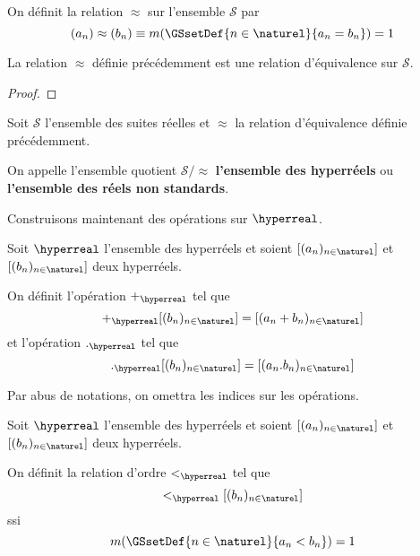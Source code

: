 \begin{definition}
	On définit la relation $\approx$ sur l'ensemble $\mathcal{S}$ par
	\begin{equation}
		(a_{n}) \approx (b_{n}) \equiv m(\GSsetDef{n \in \naturel}{a_{n} =
		b_{n}}) = 1
	\end{equation}
\end{definition}

\begin{proposition}
	La relation $\approx$ définie précédemment est une relation d'équivalence sur
	$\mathcal{S}$.
\end{proposition}

\ifdefined\outputproof
\begin{proof}

\end{proof}
\fi

\begin{definition}
	Soit $\mathcal{S}$ l'ensemble des suites réelles et $\approx$ la relation
	d'équivalence définie précédemment.

	On appelle l'ensemble quotient $\mathcal{S} / \approx$ \textbf{l'ensemble des hyperréels} ou
	\textbf{l'ensemble des réels non standards}.
\end{definition}

Construisons maintenant des opérations sur $\hyperreal$.

\begin{definition}
	Soit $\hyperreal$ l'ensemble des hyperréels et soient $[(a_{n})_{n \in
	\naturel}]$ et $[(b_{n})_{n \in \naturel}]$ deux hyperréels.

	On définit l'opération $+_{\hyperreal}$ tel que
	\begin{equation}
		[(a_{n})_{n \in \naturel}] +_{\hyperreal} [(b_{n})_{n \in \naturel}] = [(a_{n} +
		b_{n})_{n \in \naturel}]
	\end{equation}
	et l'opération $._{\hyperreal}$ tel que
	\begin{equation}
		[(a_{n})_{n \in \naturel}] ._{\hyperreal}  [(b_{n})_{n \in \naturel}] =
		[(a_{n} .
		b_{n})_{n \in \naturel}]
	\end{equation}

	Par abus de notations, on omettra les indices sur les opérations.
\end{definition}

\begin{definition}
	Soit $\hyperreal$ l'ensemble des hyperréels et soient $[(a_{n})_{n \in
	\naturel}]$ et $[(b_{n})_{n \in \naturel}]$ deux hyperréels.

	On définit la relation d'ordre $<_{\hyperreal}$ tel que
	\begin{equation}
		[(a_{n})_{n \in \naturel}] <_{\hyperreal} [(b_{n})_{n \in \naturel}]
	\end{equation}
	ssi
	\begin{equation}
		m(\GSsetDef{n \in \naturel}{a_{n} < b_{n}}) = 1
	\end{equation}
\end{definition}

